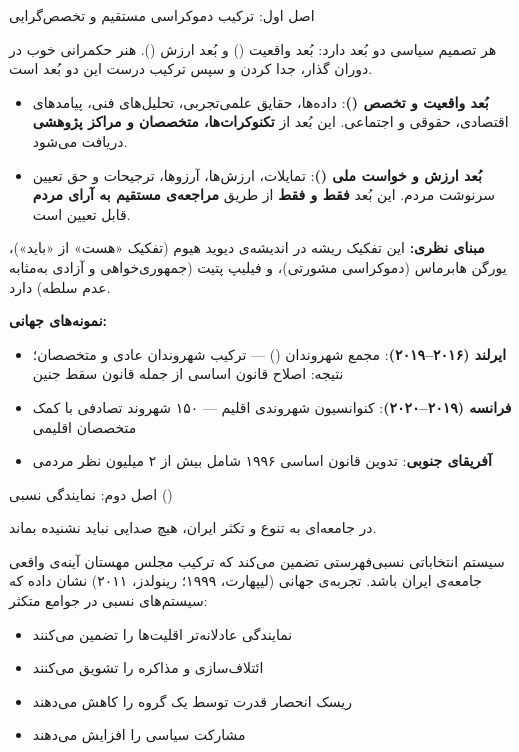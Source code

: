 \begin{principlebox}{اصل اول: ترکیب دموکراسی مستقیم و تخصص‌گرایی}
	\begin{quotebox}
		هر تصمیم سیاسی دو بُعد دارد: بُعد واقعیت () و بُعد ارزش ().
		هنر حکمرانی خوب در دوران گذار، جدا کردن و سپس ترکیب درست این دو بُعد است.
	\end{quotebox}
	
	\vspace{0.5em}
	\begin{itemize}
		\item \textbf{بُعد واقعیت و تخصص ()}: داده‌ها، حقایق علمی‌تجربی،
		تحلیل‌های فنی، پیامدهای اقتصادی، حقوقی و اجتماعی. این بُعد از \textbf{تکنوکرات‌ها،
			متخصصان و مراکز پژوهشی} دریافت می‌شود.
		
		\item \textbf{بُعد ارزش و خواست ملی ()}: تمایلات، ارزش‌ها،
		آرزوها، ترجیحات و حق تعیین سرنوشت مردم. این بُعد \textbf{فقط و فقط} از طریق
		\textbf{مراجعه‌ی مستقیم به آرای مردم} قابل تعیین است.
	\end{itemize}
	
	\vspace{0.5em}
	\textbf{مبنای نظری:} این تفکیک ریشه در اندیشه‌ی دیوید هیوم (تفکیک «هست» از «باید»)،
	یورگن هابرماس (دموکراسی مشورتی)، و فیلیپ پتیت (جمهوری‌خواهی و آزادی به‌مثابه
	عدم سلطه) دارد.
	
	\textbf{نمونه‌های جهانی:}
	\begin{itemize}
		\item \textbf{ایرلند (۲۰۱۶--۲۰۱۹)}: مجمع شهروندان () --- ترکیب شهروندان عادی و متخصصان؛ نتیجه: اصلاح قانون اساسی از جمله قانون سقط جنین
		\item \textbf{فرانسه (۲۰۱۹--۲۰۲۰)}: کنوانسیون شهروندی اقلیم --- ۱۵۰ شهروند تصادفی با کمک متخصصان اقلیمی
		\item \textbf{آفریقای جنوبی}: تدوین قانون اساسی ۱۹۹۶ شامل بیش از ۲ میلیون نظر مردمی
	\end{itemize}
\end{principlebox}

\begin{principlebox}{اصل دوم: نمایندگی نسبی ()}
	\begin{quotebox}
		در جامعه‌ای به تنوع و تکثر ایران، هیچ صدایی نباید نشنیده بماند.
	\end{quotebox}
	
	سیستم انتخاباتی نسبی‌فهرستی تضمین می‌کند که ترکیب مجلس مهستان آینه‌ی واقعی جامعه‌ی
	ایران باشد. تجربه‌ی جهانی (لیپهارت، ۱۹۹۹؛ رینولدز، ۲۰۱۱) نشان داده که سیستم‌های
	نسبی در جوامع متکثر:
	\begin{itemize}
		\item نمایندگی عادلانه‌تر اقلیت‌ها را تضمین می‌کنند
		\item ائتلاف‌سازی و مذاکره را تشویق می‌کنند
		\item ریسک انحصار قدرت توسط یک گروه را کاهش می‌دهند
		\item مشارکت سیاسی را افزایش می‌دهند
	\end{itemize}
\end{principlebox}

